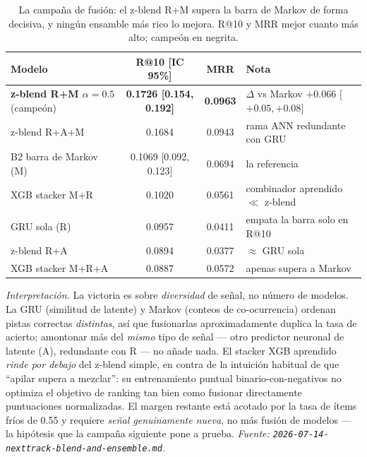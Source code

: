 \documentclass[11pt]{article}
\newcommand{\best}[1]{\textbf{#1}}
\begin{document}
\begin{table}[ht]
  \centering
  \caption{La campaña de fusión: el z-blend R+M supera la barra de Markov de
  forma decisiva, y ningún ensamble más rico lo mejora. R@10 y MRR mejor cuanto
  más alto; campeón en negrita.}
  \label{tab:blend}
  {\small\setlength{\tabcolsep}{5pt}\begin{tabular}{lccl}
    \toprule
    Modelo & R@10 [IC 95\%] & MRR & Nota \\
    \midrule
    \best{z-blend R+M $\alpha{=}0.5$} (campeón) & \best{0.1726 [0.154, 0.192]} & \best{0.0963} & $\Delta$ vs Markov $+0.066$ [$+0.05,+0.08$] \\
    z-blend R+A+M                                & 0.1684 & 0.0943 & rama ANN redundante con GRU \\
    B2 barra de Markov (M)                       & 0.1069 [0.092, 0.123] & 0.0694 & la referencia \\
    XGB stacker M+R                              & 0.1020 & 0.0561 & combinador aprendido $\ll$ z-blend \\
    GRU sola (R)                                 & 0.0957 & 0.0411 & empata la barra solo en R@10 \\
    z-blend R+A                                  & 0.0894 & 0.0377 & $\approx$ GRU sola \\
    XGB stacker M+R+A                            & 0.0887 & 0.0572 & apenas supera a Markov \\
    \bottomrule
  \end{tabular}}
\end{table}

\emph{Interpretación.} La victoria es sobre \emph{diversidad} de señal, no
número de modelos. La GRU (similitud de latente) y Markov (conteos de
co-ocurrencia) ordenan pistas correctas \emph{distintas}, así que fusionarlas
aproximadamente duplica la tasa de acierto; amontonar más del \emph{mismo} tipo
de señal --- otro predictor neuronal de latente (A), redundante con R --- no
añade nada. El stacker XGB aprendido \emph{rinde por debajo} del z-blend simple,
en contra de la intuición habitual de que ``apilar supera a mezclar'': su
entrenamiento puntual binario-con-negativos no optimiza el objetivo de ranking
tan bien como fusionar directamente puntuaciones normalizadas. El margen
restante está acotado por la tasa de ítems fríos de \num{0.55} y requiere
\emph{señal genuinamente nueva}, no más fusión de modelos --- la hipótesis que
la campaña siguiente pone a prueba.
\emph{Fuente: \texttt{2026-07-14-nexttrack-blend-and-ensemble.md}.}
\end{document}
